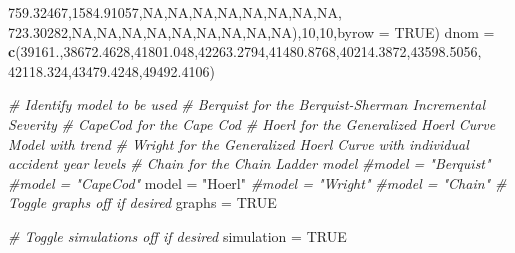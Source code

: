 \documentclass[]{article}
\newenvironment{Shaded}{\begin{snugshade}}{\end{snugshade}}
\newcommand{\CommentTok}[1]{\textcolor[rgb]{0.56,0.35,0.01}{\textit{#1}}}
\newcommand{\DataTypeTok}[1]{\textcolor[rgb]{0.13,0.29,0.53}{#1}}
\newcommand{\DecValTok}[1]{\textcolor[rgb]{0.00,0.00,0.81}{#1}}
\newcommand{\FloatTok}[1]{\textcolor[rgb]{0.00,0.00,0.81}{#1}}
\newcommand{\KeywordTok}[1]{\textcolor[rgb]{0.13,0.29,0.53}{\textbf{#1}}}
\newcommand{\NormalTok}[1]{#1}
\newcommand{\OtherTok}[1]{\textcolor[rgb]{0.56,0.35,0.01}{#1}}
\newcommand{\StringTok}[1]{\textcolor[rgb]{0.31,0.60,0.02}{#1}}
\begin{document}
\begin{Shaded}
\begin{Highlighting}[]
            \FloatTok{759.32467}\NormalTok{,}\FloatTok{1584.91057}\NormalTok{,}\OtherTok{NA}\NormalTok{,}\OtherTok{NA}\NormalTok{,}\OtherTok{NA}\NormalTok{,}\OtherTok{NA}\NormalTok{,}\OtherTok{NA}\NormalTok{,}\OtherTok{NA}\NormalTok{,}\OtherTok{NA}\NormalTok{,}\OtherTok{NA}\NormalTok{,}
            \FloatTok{723.30282}\NormalTok{,}\OtherTok{NA}\NormalTok{,}\OtherTok{NA}\NormalTok{,}\OtherTok{NA}\NormalTok{,}\OtherTok{NA}\NormalTok{,}\OtherTok{NA}\NormalTok{,}\OtherTok{NA}\NormalTok{,}\OtherTok{NA}\NormalTok{,}\OtherTok{NA}\NormalTok{,}\OtherTok{NA}\NormalTok{),}\DecValTok{10}\NormalTok{,}\DecValTok{10}\NormalTok{,}\DataTypeTok{byrow =} \OtherTok{TRUE}\NormalTok{)}
\NormalTok{dnom =}\StringTok{ }\KeywordTok{c}\NormalTok{(}\FloatTok{39161.}\NormalTok{,}\FloatTok{38672.4628}\NormalTok{,}\FloatTok{41801.048}\NormalTok{,}\FloatTok{42263.2794}\NormalTok{,}\FloatTok{41480.8768}\NormalTok{,}\FloatTok{40214.3872}\NormalTok{,}\FloatTok{43598.5056}\NormalTok{,}
       \FloatTok{42118.324}\NormalTok{,}\FloatTok{43479.4248}\NormalTok{,}\FloatTok{49492.4106}\NormalTok{)}

\CommentTok{# Identify model to be used}
\CommentTok{#   Berquist for the Berquist-Sherman Incremental Severity}
\CommentTok{#   CapeCod for the Cape Cod}
\CommentTok{#   Hoerl for the Generalized Hoerl Curve Model with trend}
\CommentTok{#   Wright for the Generalized Hoerl Curve with individual accident year levels}
\CommentTok{#   Chain for the Chain Ladder model}
\CommentTok{#model = "Berquist"}
\CommentTok{#model = "CapeCod"}
\NormalTok{model =}\StringTok{ "Hoerl"}
\CommentTok{#model = "Wright"}
\CommentTok{#model = "Chain"}
\CommentTok{# Toggle graphs off if desired}
\NormalTok{graphs =}\StringTok{ }\OtherTok{TRUE}

\CommentTok{# Toggle simulations off if desired}
\NormalTok{simulation =}\StringTok{ }\OtherTok{TRUE}
\end{Highlighting}
\end{Shaded}
\end{document}
